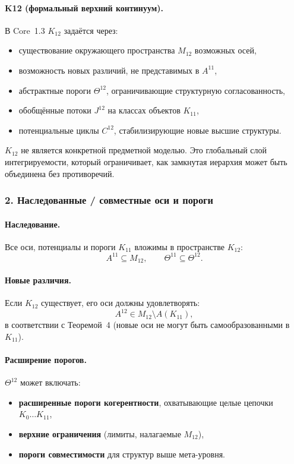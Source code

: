 \paragraph{K12 (формальный верхний континуум).}
В Core~1.3 $K_{12}$ задаётся через:
\begin{itemize}
  \item существование окружающего пространства $M_{12}$ возможных осей,
  \item возможность новых различий, не представимых в $A^{11}$,
  \item абстрактные пороги $\Theta^{12}$, ограничивающие структурную
        согласованность,
  \item обобщённые потоки $J^{12}$ на классах объектов $K_{11}$,
  \item потенциальные циклы $C^{12}$, стабилизирующие новые высшие структуры.
\end{itemize}

$K_{12}$ не является конкретной предметной моделью. Это глобальный слой
интегрируемости, который ограничивает, как замкнутая иерархия может быть
объединена без противоречий.

\subsubsection{2. Наследованные / совместные оси и пороги}

\paragraph{Наследование.}
Все оси, потенциалы и пороги $K_{11}$ вложимы в пространстве
$K_{12}$:
\[
A^{11} \subseteq M_{12}, \qquad
\Theta^{11} \subseteq \Theta^{12}.
\]

\paragraph{Новые различия.}
Если $K_{12}$ существует, его оси должны удовлетворять:
\[
A^{12} \in M_{12} \setminus A(K_{11}),
\]
в соответствии с Теоремой~4 (новые оси не могут быть самообразованными в $K_{11}$).

\paragraph{Расширение порогов.}
$\Theta^{12}$ может включать:
\begin{itemize}
  \item \textbf{расширенные пороги когерентности}, охватывающие целые цепочки
        $K_0\dots K_{11}$,
  \item \textbf{верхние ограничения} (лимиты, налагаемые $M_{12}$),
  \item \textbf{пороги совместимости} для структур выше мета-уровня.
\end{itemize}

